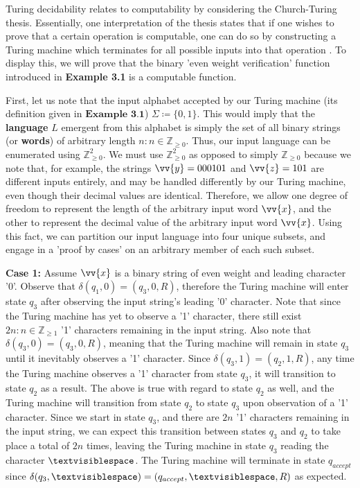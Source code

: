 \documentclass{article}
\begin{document}
\noindent Turing decidability relates to computability by considering the Church-Turing thesis.  Essentially, one interpretation of the thesis states that if one wishes to prove that a certain operation is computable, one can do so by constructing a Turing machine which terminates for all possible inputs into that operation \cite{4}.  To display this, we will prove that the binary 'even weight verification' function introduced in \textbf{Example 3.1} is a computable function.
\begin{prf}
	First, let us note that the input alphabet accepted by our Turing machine (its definition given in $\textbf{Example 3.1}$) $\Sigma \coloneq \{ 0, 1 \}$.  This would imply that the \textbf{language} $L$ emergent from this alphabet is simply the set of all binary strings (or \textbf{words}) of arbitrary length $n : n \in \mathbb{Z}_{\geq 0}$.  Thus, our input language can be enumerated using $\mathbb{Z}^{2}_{\geq 0}$.  We must use $\mathbb{Z}^{2}_{\geq 0}$ as opposed to simply $\mathbb{Z}_{\geq 0}$ because we note that, for example, the strings $\vv{y}=000101$ and $\vv{z}=101$ are different inputs entirely, and may be handled differently by our Turing machine, even though their decimal values are identical.  Therefore, we allow one degree of freedom to represent the length of the arbitrary input word $\vv{x}$, and the other to represent the decimal value of the arbitrary input word $\vv{x}$.  Using this fact, we can partition our input language into four unique subsets, and engage in a 'proof by cases' on an arbitrary member of each such subset.\\
\begin{adjustwidth}{0.5cm}{}
	\textbf{Case 1:} Assume $\vv{x}$ is a binary string of even weight and leading character '0'.  Observe that $\delta(q_{1}, 0) = (q_{3}, 0, R)$, therefore the Turing machine will enter state $q_{3}$ after observing the input string's leading '0' character.  Note that since the Turing machine has yet to observe a '1' character, there still exist $2n : n \in \mathbb{Z}_{\geq 1}$ '1' characters remaining in the input string.  Also note that $\delta(q_{3}, 0) = (q_{3}, 0, R)$, meaning that the Turing machine will remain in state $q_{3}$ until it inevitably observes a '1' character.  Since $\delta(q_{3}, 1) = (q_{2}, 1, R)$, any time the Turing machine observes a '1' character from state $q_{3}$, it will transition to state $q_{2}$ as a result.  The above is true with regard to state $q_{2}$ as well, and the Turing machine will transition from state $q_{2}$ to state $q_{3}$ upon observation of a '1' character.  Since we start in state $q_{3}$, and there are $2n$ '1' characters remaining in the input string, we can expect this transition between states $q_{3}$ and $q_{2}$ to take place a total of $2n$ times, leaving the Turing machine in state $q_{3}$ reading the character $\textvisiblespace$.  The Turing machine will terminate in state $q_{accept}$ since $\delta(q_{3}, \textvisiblespace) = (q_{accept}, \textvisiblespace, R)$ as expected.\\

\end{adjustwidth}
\end{prf}
\end{document}
